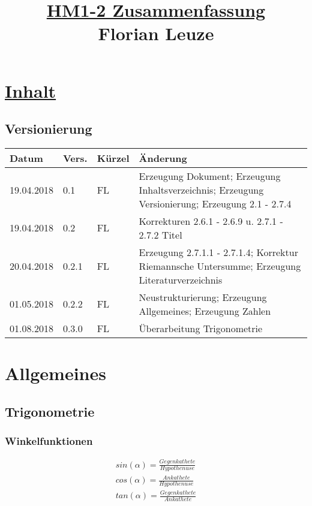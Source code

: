 \documentclass[12pt,a4paper]{article}%
\numberwithin{equation}{section}
\numberwithin{equation}{subsection}
\begin{document}


\author{}
\title{\underline{HM1-2 Zusammenfassung} \\ $\;$ \\ $\;$ \\ Florian Leuze}
\date{}

\maketitle %
\newpage
\section{\underline{Inhalt}}
\tableofcontents

  \subsection{Versionierung}
  \begin{tabular}{|p{2cm}|p{1cm}|p{1.5cm}|p{8.5cm}|}\hline
    Datum & Vers. & Kürzel & Änderung \\ \hline
    19.04.2018 & 0.1 & FL & Erzeugung Dokument; Erzeugung Inhaltsverzeichnis; Erzeugung Versionierung; Erzeugung 2.1 - 2.7.4 \\ \hline
    19.04.2018 & 0.2 & FL & Korrekturen 2.6.1 - 2.6.9 u. 2.7.1 - 2.7.2 Titel\\ \hline
    20.04.2018 & 0.2.1 & FL & Erzeugung 2.7.1.1 - 2.7.1.4; Korrektur Riemannsche Untersumme; Erzeugung Literaturverzeichnis \\ \hline
    01.05.2018 & 0.2.2 & FL & Neustrukturierung; Erzeugung Allgemeines; Erzeugung Zahlen \\ \hline
    01.08.2018 & 0.3.0 & FL & Überarbeitung Trigonometrie \\ \hline
  \end{tabular}

\newpage

\section{Allgemeines}
	\subsection{Trigonometrie}
	  \subsubsection{Winkelfunktionen}
	  \begin{align}
	    sin(\alpha) = \frac{Gegenkathete}{Hypothenuse}\\
	    cos(\alpha) = \frac{Ankathete}{Hypothenuse}\\
	    tan(\alpha) = \frac{Gegenkathete}{Ankathete} \label{eq:trigo_Winkelf}
	  \end{align}
	  
\end{document}
